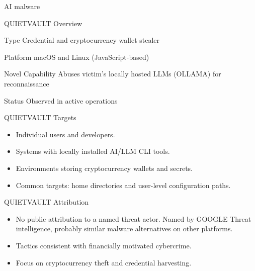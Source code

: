 \documentclass{beamer}
\begin{document}
\begin{frame}{AI malware}
\Large{}
\end{frame}

\begin{frame}{QUIETVAULT Overview}
\begin{block}{Type}
Credential and cryptocurrency wallet stealer
\end{block}

\begin{block}{Platform}
macOS and Linux (JavaScript-based)
\end{block}

\begin{block}{Novel Capability}
Abuses victim's locally hosted LLMs (OLLAMA) for reconnaissance
\end{block}

\begin{block}{Status}
Observed in active operations
\end{block}
\end{frame}

\begin{frame}{QUIETVAULT Targets}
\begin{itemize}
    \item Individual users and developers.
    \item Systems with locally installed AI/LLM CLI tools.
    \item Environments storing cryptocurrency wallets and secrets.
    \item Common targets: home directories and user-level configuration paths.
\end{itemize}
\end{frame}

\begin{frame}{QUIETVAULT Attribution}
\begin{itemize}
    \item No public attribution to a named threat actor. Named by GOOGLE Threat intelligence, probably similar malware alternatives on other platforms.
    \item Tactics consistent with financially motivated cybercrime.
    \item Focus on cryptocurrency theft and credential harvesting.
\end{itemize}
\end{frame}
\end{document}
